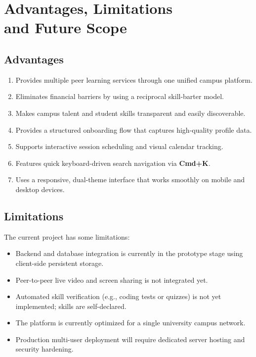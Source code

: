 \documentclass[12pt,a4paper]{report}
\begin{document}
\chapter[Advantages, Limitations and Future Scope]{Advantages, Limitations\\and Future Scope}

\section{Advantages}
\begin{enumerate}
    \item Provides multiple peer learning services through one unified campus platform.
    \item Eliminates financial barriers by using a reciprocal skill-barter model.
    \item Makes campus talent and student skills transparent and easily discoverable.
    \item Provides a structured onboarding flow that captures high-quality profile data.
    \item Supports interactive session scheduling and visual calendar tracking.
    \item Features quick keyboard-driven search navigation via \textbf{Cmd+K}.
    \item Uses a responsive, dual-theme interface that works smoothly on mobile and desktop devices.
\end{enumerate}

\section{Limitations}
The current project has some limitations:
\begin{itemize}
    \item Backend and database integration is currently in the prototype stage using client-side persistent storage.
    \item Peer-to-peer live video and screen sharing is not integrated yet.
    \item Automated skill verification (e.g., coding tests or quizzes) is not yet implemented; skills are self-declared.
    \item The platform is currently optimized for a single university campus network.
    \item Production multi-user deployment will require dedicated server hosting and security hardening.
\end{itemize}
\end{document}
